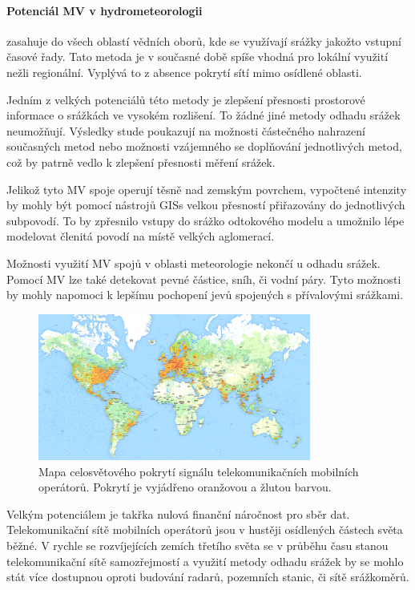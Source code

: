 \documentclass[a4paper,12pt,oneside]{report}
\begin{document}
\paragraph*{Potenciál MV v hydrometeorologii} zasahuje do všech oblastí vědních oborů, kde se využívají srážky jakožto vstupní časové řady. Tato metoda je v současné době spíše vhodná pro lokální využití nežli regionální. Vyplývá to z absence pokrytí sítí mimo osídlené oblasti. 

Jedním z velkých potenciálů této metody je zlepšení přesnosti prostorové informace o srážkách ve vysokém rozlišení. To žádné jiné metody odhadu srážek neumožňují. Výsledky stude\cite{mv2} poukazují na možnosti částečného nahrazení současných metod nebo možnosti vzájemného se doplňování jednotlivých metod, což by patrně vedlo k zlepšení přesnosti měření srážek. 

Jelikož tyto MV spoje operují těsně nad zemským povrchem, vypočtené intenzity by mohly být pomocí nástrojů \acs{GIS}s velkou přesností přiřazovány do jednotlivých subpovodí. To by zpřesnilo vstupy do srážko odtokového modelu a umožnilo lépe modelovat členitá povodí na místě velkých aglomerací.

Možnosti využití MV spojů v oblasti meteorologie nekončí u odhadu srážek. Pomocí MV lze také detekovat pevné částice, sníh, či vodní páry. Tyto možnosti by mohly napomoci k lepšímu pochopení jevů spojených s přívalovými srážkami.\cite{mv2}
\begin{figure}[h!]
    \centering
    \includegraphics[width=0.8\textwidth]{./img/srazky/opensignalmap.png}
    \caption[Porytí tel. sítí]{\centering Mapa celosvětového pokrytí signálu telekomunikačních mobilních operátorů. Pokrytí je vyjádřeno oranžovou a žlutou barvou. \footnotemark }
 \end{figure}   

Velkým potenciálem je takřka nulová finanční náročnost pro sběr dat. Telekomunikační sítě mobilních operátorů jsou v hustěji osídlených částech světa běžné. V rychle se rozvíjejících zemích třetího světa se v průběhu času stanou telekomunikační sítě samozřejmostí a využití metody odhadu srážek by se mohlo stát více dostupnou oproti budování radarů, pozemních stanic, či sítě srážkoměrů.
 
\end{document}

